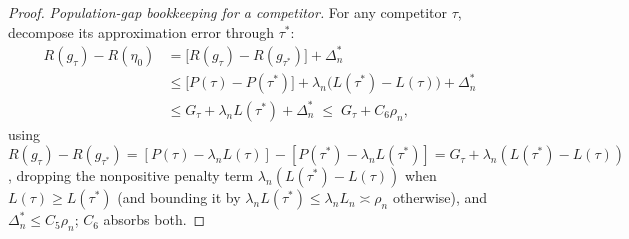 \begin{proof}
\emph{Population-gap bookkeeping for a competitor.} For any competitor
$\tau$, decompose its approximation error through $\tau^\ast$:
\begin{align}
  R(g_\tau)-R(\eta_0)
  &= \bigl[R(g_\tau)-R(g_{\tau^\ast})\bigr] + \Delta^\ast_n \nonumber\\
  &\le \bigl[P(\tau)-P(\tau^\ast)\bigr] + \lambda_n\bigl(L(\tau^\ast)-L(\tau)\bigr)
      + \Delta^\ast_n \nonumber\\
  &\le G_\tau + \lambda_n L(\tau^\ast) + \Delta^\ast_n
  \;\le\; G_\tau + C_6\rho_n,
  \label{eq:gtau-approx}
\end{align}
using $R(g_\tau)-R(g_{\tau^\ast})=[P(\tau)-\lambda_n L(\tau)]-[P(\tau^\ast)-
\lambda_n L(\tau^\ast)]=G_\tau+\lambda_n(L(\tau^\ast)-L(\tau))$, dropping the
nonpositive penalty term $\lambda_n(L(\tau^\ast)-L(\tau))$ when $L(\tau)\ge
L(\tau^\ast)$ (and bounding it by $\lambda_n L(\tau^\ast)\le\lambda_n L_n
\asymp\rho_n$ otherwise), and $\Delta^\ast_n\le C_5\rho_n$; $C_6$ absorbs both.


\end{proof}
